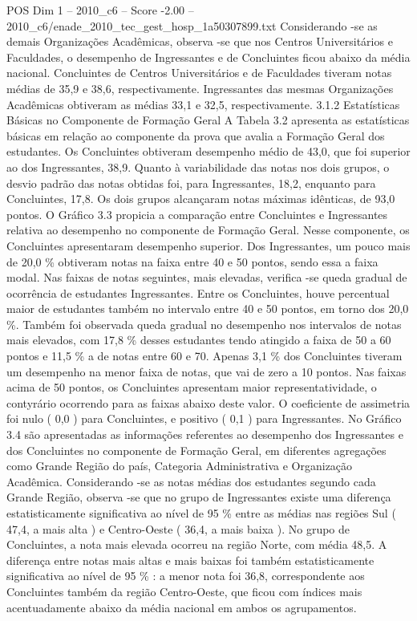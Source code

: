 \begin{textsample}{POS Dim 1 – 2010\_c6 – Score -2.00 – 2010\_c6/enade\_2010\_tec\_gest\_hosp\_1a50307899.txt}
Considerando -se as demais Organizações Acadêmicas, observa -se que nos Centros Universitários e Faculdades, o desempenho de Ingressantes e de Concluintes ficou abaixo da média nacional.
Concluintes de Centros Universitários e de Faculdades tiveram notas médias de 35,9 e 38,6, respectivamente.
Ingressantes das mesmas Organizações Acadêmicas obtiveram as médias 33,1 e 32,5, respectivamente. 3.1.2 Estatísticas Básicas no Componente de Formação Geral A Tabela 3.2 apresenta as estatísticas básicas em relação ao componente da prova que avalia a Formação Geral dos estudantes.
Os Concluintes obtiveram desempenho médio de 43,0, que foi superior ao dos Ingressantes, 38,9.
Quanto à variabilidade das notas nos dois grupos, o desvio padrão das notas obtidas foi, para Ingressantes, 18,2, enquanto para Concluintes, 17,8.
Os dois grupos alcançaram notas máximas idênticas, de 93,0 pontos.
O Gráfico 3.3 propicia a comparação entre Concluintes e Ingressantes relativa ao desempenho no componente de Formação Geral.
Nesse componente, os Concluintes apresentaram desempenho superior.
Dos Ingressantes, um pouco mais de 20,0 \% obtiveram notas na faixa entre 40 e 50 pontos, sendo essa a faixa modal.
Nas faixas de notas seguintes, mais elevadas, verifica -se queda gradual de ocorrência de estudantes Ingressantes.
Entre os Concluintes, houve percentual maior de estudantes também no intervalo entre 40 e 50 pontos, em torno dos 20,0 \%.
Também foi observada queda gradual no desempenho nos intervalos de notas mais elevados, com 17,8 \% desses estudantes tendo atingido a faixa de 50 a 60 pontos e 11,5 \% a de notas entre 60 e 70.
Apenas 3,1 \% dos Concluintes tiveram um desempenho na menor faixa de notas, que vai de zero a 10 pontos.
Nas faixas acima de 50 pontos, os Concluintes apresentam maior representatividade, o contyrário ocorrendo para as faixas abaixo deste valor.
O coeficiente de assimetria foi nulo ( 0,0 ) para Concluintes, e positivo ( 0,1 ) para Ingressantes.
No Gráfico 3.4 são apresentadas as informações referentes ao desempenho dos Ingressantes e dos Concluintes no componente de Formação Geral, em diferentes agregações como Grande Região do país, Categoria Administrativa e Organização Acadêmica.
Considerando -se as notas médias dos estudantes segundo cada Grande Região, observa -se que no grupo de Ingressantes existe uma diferença estatisticamente significativa ao nível de 95 \% entre as médias nas regiões Sul ( 47,4, a mais alta ) e Centro-Oeste ( 36,4, a mais baixa ).
No grupo de Concluintes, a nota mais elevada ocorreu na região Norte, com média 48,5.
A diferença entre notas mais altas e mais baixas foi também estatisticamente significativa ao nível de 95 \% : a menor nota foi 36,8, correspondente aos Concluintes também da região Centro-Oeste, que ficou com índices mais acentuadamente abaixo da média nacional em ambos os agrupamentos.

\end{textsample}
